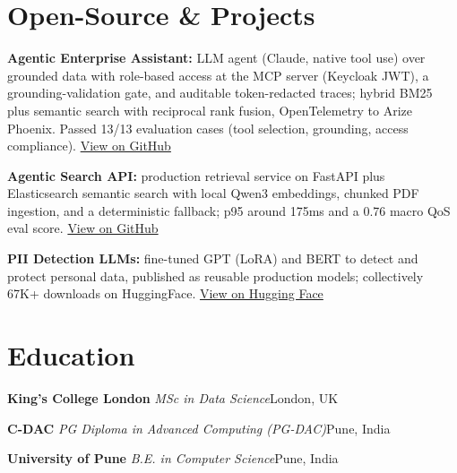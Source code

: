 \documentclass[10pt,a4paper]{article}
\newcommand{\sep}{\,\textcolor{accent!60}{\textbar}\,}
\begin{document}
\section{Open-Source \& Projects}
\begin{tight}
  \item \textbf{Agentic Enterprise Assistant:} LLM agent (Claude, native tool use) over grounded data with role-based access at the MCP server (Keycloak JWT), a grounding-validation gate, and auditable token-redacted traces; hybrid BM25 plus semantic search with reciprocal rank fusion, OpenTelemetry to Arize Phoenix. Passed 13/13 evaluation cases (tool selection, grounding, access compliance). \href{https://github.com/abhijeetscode/Agentic-Enterprise-Assistant}{View on GitHub}
  \item \textbf{Agentic Search API:} production retrieval service on FastAPI plus Elasticsearch semantic search with local Qwen3 embeddings, chunked PDF ingestion, and a deterministic fallback; p95 around 175ms and a 0.76 macro QoS eval score. \href{https://github.com/abhijeetscode/search-agent}{View on GitHub}
  \item \textbf{PII Detection LLMs:} fine-tuned GPT (LoRA) and BERT to detect and protect personal data, published as reusable production models; collectively 67K+ downloads on HuggingFace. \href{https://huggingface.co/ab-ai/pii_model}{View on Hugging Face}
\end{tight}

\section{Education}
{\color{company}\bfseries King's College London}\sep{\itshape MSc in Data Science}\hfill {\color{muted}London, UK}\par\vspace{1pt}
{\color{company}\bfseries C-DAC}\sep{\itshape PG Diploma in Advanced Computing (PG-DAC)}\hfill {\color{muted}Pune, India}\par\vspace{1pt}
{\color{company}\bfseries University of Pune}\sep{\itshape B.E. in Computer Science}\hfill {\color{muted}Pune, India}\par
\end{document}
